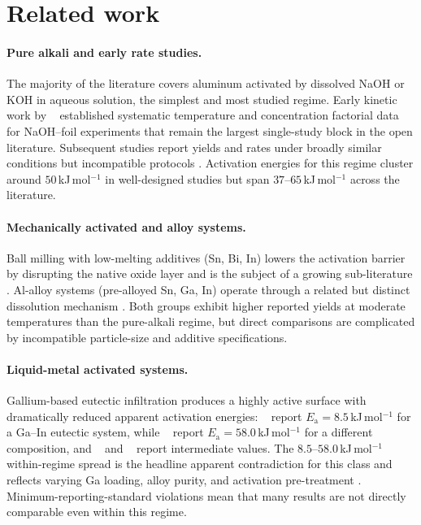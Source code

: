 \section{Related work}
\label{sec:related}

\paragraph{Pure alkali and early rate studies.}
The majority of the literature covers aluminum activated by dissolved NaOH or KOH in
aqueous solution, the simplest and most studied regime. Early kinetic work by
\citeauthor{porciuncula2012}~\citep{porciuncula2012} established systematic temperature and
concentration factorial data for NaOH–foil experiments that remain the largest single-study
block in the open literature. Subsequent studies report yields and rates under broadly
similar conditions but incompatible protocols
\citep{wen2018,wanghq2017,yavor2013,trowell2022,deng2010,prabu2021,rin2021,zhang2024}.
Activation energies for this regime cluster around $50$\,kJ\,mol$^{-1}$ in well-designed
studies but span $37$--$65$\,kJ\,mol$^{-1}$ across the literature.

\paragraph{Mechanically activated and alloy systems.}
Ball milling with low-melting additives (Sn, Bi, In) lowers the activation barrier by
disrupting the native oxide layer and is the subject of a growing sub-literature
\citep{xiao2018,guan2019,preez2018,chen2020,xiao2020,davies2022mat}. Al-alloy systems
(pre-alloyed Sn, Ga, In) operate through a related but distinct dissolution mechanism
\citep{liuyh2017,qiao2019,meng2022}. Both groups exhibit higher reported yields at
moderate temperatures than the pure-alkali regime, but direct comparisons are complicated
by incompatible particle-size and additive specifications.

\paragraph{Liquid-metal activated systems.}
Gallium-based eutectic infiltration produces a highly active surface with dramatically
reduced apparent activation energies: \citeauthor{ilyukhina2012}~\citep{ilyukhina2012}
report $E_\mathrm{a}\!=\!8.5$\,kJ\,mol$^{-1}$ for a Ga--In eutectic system, while
\citeauthor{dudoladov2016}~\citep{dudoladov2016} report $E_\mathrm{a}\!=\!58.0$\,kJ\,mol$^{-1}$
for a different composition, and \citeauthor{jayaraman2015}~\citep{jayaraman2015} and
\citeauthor{lu2017}~\citep{lu2017} report intermediate values. The $8.5$--$58.0$\,kJ\,mol$^{-1}$
within-regime spread is the headline apparent contradiction for this class and reflects
varying Ga loading, alloy purity, and activation pre-treatment
\citep{fischman2020}. Minimum-reporting-standard violations mean that many results are
not directly comparable even within this regime.

